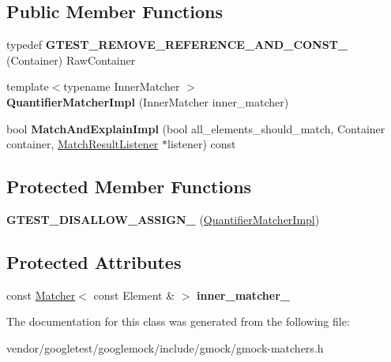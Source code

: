 \subsection*{Public Member Functions}
\begin{DoxyCompactItemize}
\item 
typedef {\bfseries G\+T\+E\+S\+T\+\_\+\+R\+E\+M\+O\+V\+E\+\_\+\+R\+E\+F\+E\+R\+E\+N\+C\+E\+\_\+\+A\+N\+D\+\_\+\+C\+O\+N\+S\+T\+\_\+} (Container) Raw\+Container\hypertarget{classtesting_1_1internal_1_1QuantifierMatcherImpl_aa3648a9fce92090dc3987eb10faf16e1}{}\label{classtesting_1_1internal_1_1QuantifierMatcherImpl_aa3648a9fce92090dc3987eb10faf16e1}

\item 
{\footnotesize template$<$typename Inner\+Matcher $>$ }\\{\bfseries Quantifier\+Matcher\+Impl} (Inner\+Matcher inner\+\_\+matcher)\hypertarget{classtesting_1_1internal_1_1QuantifierMatcherImpl_aef125c9971ea1d02d138cd8fd2af0287}{}\label{classtesting_1_1internal_1_1QuantifierMatcherImpl_aef125c9971ea1d02d138cd8fd2af0287}

\item 
bool {\bfseries Match\+And\+Explain\+Impl} (bool all\+\_\+elements\+\_\+should\+\_\+match, Container container, \hyperlink{classtesting_1_1MatchResultListener}{Match\+Result\+Listener} $\ast$listener) const \hypertarget{classtesting_1_1internal_1_1QuantifierMatcherImpl_a01384d42781094ddc5d9208b63f23b3d}{}\label{classtesting_1_1internal_1_1QuantifierMatcherImpl_a01384d42781094ddc5d9208b63f23b3d}

\end{DoxyCompactItemize}
\subsection*{Protected Member Functions}
\begin{DoxyCompactItemize}
\item 
{\bfseries G\+T\+E\+S\+T\+\_\+\+D\+I\+S\+A\+L\+L\+O\+W\+\_\+\+A\+S\+S\+I\+G\+N\+\_\+} (\hyperlink{classtesting_1_1internal_1_1QuantifierMatcherImpl}{Quantifier\+Matcher\+Impl})\hypertarget{classtesting_1_1internal_1_1QuantifierMatcherImpl_ad57fcd1799e59217fe40c0144ff024f1}{}\label{classtesting_1_1internal_1_1QuantifierMatcherImpl_ad57fcd1799e59217fe40c0144ff024f1}

\end{DoxyCompactItemize}
\subsection*{Protected Attributes}
\begin{DoxyCompactItemize}
\item 
const \hyperlink{classtesting_1_1Matcher}{Matcher}$<$ const Element \& $>$ {\bfseries inner\+\_\+matcher\+\_\+}\hypertarget{classtesting_1_1internal_1_1QuantifierMatcherImpl_af0ee2a4697f5cb8e937fd29dd75e2a30}{}\label{classtesting_1_1internal_1_1QuantifierMatcherImpl_af0ee2a4697f5cb8e937fd29dd75e2a30}

\end{DoxyCompactItemize}


The documentation for this class was generated from the following file\+:\begin{DoxyCompactItemize}
\item 
vendor/googletest/googlemock/include/gmock/gmock-\/matchers.\+h\end{DoxyCompactItemize}
